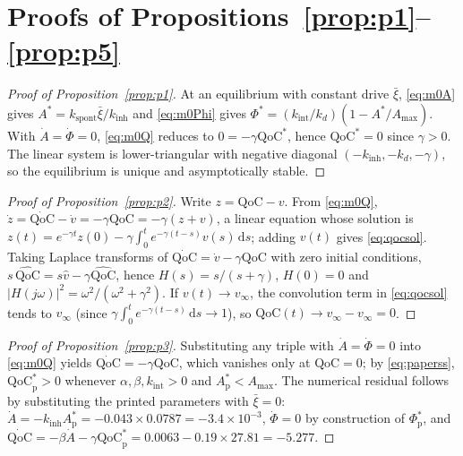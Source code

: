 \documentclass[12pt,a4paper]{article}
\theoremstyle{plain}
\theoremstyle{definition}
\theoremstyle{remark}
\newcommand{\QoC}{\mathrm{QoC}}
\newcommand{\kinh}{k_{\mathrm{inh}}}
\newcommand{\kint}{k_{\mathrm{int}}}
\newcommand{\kd}{k_{d}}
\newcommand{\kspont}{k_{\mathrm{spont}}}
\newcommand{\Amax}{A_{\max}}
\renewcommand{\dd}{\,\mathrm{d}}   %
\begin{document}
\appendix
\section{Proofs of Propositions~\ref{prop:p1}--\ref{prop:p5}}
\label{app:proofs}

\begin{proof}[Proof of Proposition~\ref{prop:p1}]
At an equilibrium with constant drive $\bar\xi$, \eqref{eq:m0A} gives $A^*=\kspont\bar\xi/\kinh$ and \eqref{eq:m0Phi} gives $\Phi^*=(\kint/\kd)(1-A^*/\Amax)$. With $\dot A=\dot\Phi=0$, \eqref{eq:m0Q} reduces to $0=-\gamma\QoC^*$, hence $\QoC^*=0$ since $\gamma>0$. The linear system is lower-triangular with negative diagonal $(-\kinh,-\kd,-\gamma)$, so the equilibrium is unique and asymptotically stable.
\end{proof}

\begin{proof}[Proof of Proposition~\ref{prop:p2}]
Write $z=\QoC-v$. From \eqref{eq:m0Q}, $\dot z=\dot{\QoC}-\dot v=-\gamma\QoC=-\gamma(z+v)$, a linear equation whose solution is $z(t)=e^{-\gamma t}z(0)-\gamma\int_0^te^{-\gamma(t-s)}v(s)\dd s$; adding $v(t)$ gives \eqref{eq:qocsol}. Taking Laplace transforms of $\dot{\QoC}=\dot v-\gamma\QoC$ with zero initial conditions, $s\,\widehat{\QoC}=s\hat v-\gamma\widehat{\QoC}$, hence $H(s)=s/(s+\gamma)$, $H(0)=0$ and $|H(j\omega)|^2=\omega^2/(\omega^2+\gamma^2)$. If $v(t)\to v_\infty$, the convolution term in \eqref{eq:qocsol} tends to $v_\infty$ (since $\gamma\int_0^te^{-\gamma(t-s)}\dd s\to1$), so $\QoC(t)\to v_\infty-v_\infty=0$.
\end{proof}

\begin{proof}[Proof of Proposition~\ref{prop:p3}]
Substituting any triple with $\dot A=\dot\Phi=0$ into \eqref{eq:m0Q} yields $\dot{\QoC}=-\gamma\QoC$, which vanishes only at $\QoC=0$; by \eqref{eq:paperss}, $\QoC^*_{\mathrm p}>0$ whenever $\alpha,\beta,\kint>0$ and $A^*_{\mathrm p}<\Amax$. The numerical residual follows by substituting the printed parameters with $\bar\xi=0$: $\dot A=-\kinh A^*_{\mathrm p}=-0.043\times0.0787=-3.4\times10^{-3}$, $\dot\Phi=0$ by construction of $\Phi^*_{\mathrm p}$, and $\dot{\QoC}=-\beta\dot A-\gamma\QoC^*_{\mathrm p}=0.0063-0.19\times27.81=-5.277$.
\end{proof}
\end{document}
